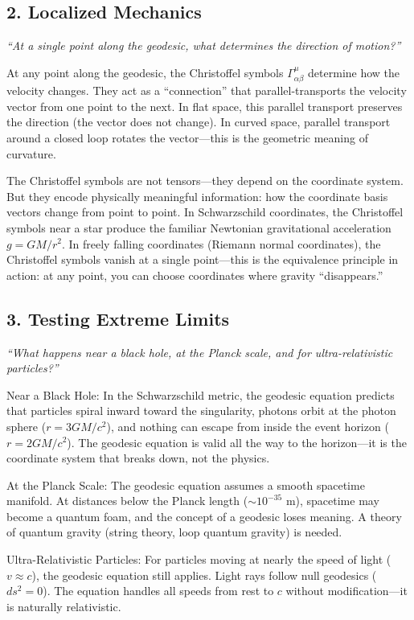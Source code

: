 \documentclass[11pt,openright]{book}
\begin{document}
\subsection*{2. Localized Mechanics}
\textit{``At a single point along the geodesic, what determines the direction of motion?''}

At any point along the geodesic, the Christoffel symbols $\Gamma^\mu_{\alpha\beta}$ determine how the velocity changes. They act as a ``connection'' that parallel-transports the velocity vector from one point to the next. In flat space, this parallel transport preserves the direction (the vector does not change). In curved space, parallel transport around a closed loop rotates the vector---this is the geometric meaning of curvature.

The Christoffel symbols are not tensors---they depend on the coordinate system. But they encode physically meaningful information: how the coordinate basis vectors change from point to point. In Schwarzschild coordinates, the Christoffel symbols near a star produce the familiar Newtonian gravitational acceleration $g = GM/r^2$. In freely falling coordinates (Riemann normal coordinates), the Christoffel symbols vanish at a single point---this is the equivalence principle in action: at any point, you can choose coordinates where gravity ``disappears.''

\subsection*{3. Testing Extreme Limits}
\textit{``What happens near a black hole, at the Planck scale, and for ultra-relativistic particles?''}

Near a Black Hole: In the Schwarzschild metric, the geodesic equation predicts that particles spiral inward toward the singularity, photons orbit at the photon sphere ($r = 3GM/c^2$), and nothing can escape from inside the event horizon ($r = 2GM/c^2$). The geodesic equation is valid all the way to the horizon---it is the coordinate system that breaks down, not the physics.

At the Planck Scale: The geodesic equation assumes a smooth spacetime manifold. At distances below the Planck length ($\sim 10^{-35}$ m), spacetime may become a quantum foam, and the concept of a geodesic loses meaning. A theory of quantum gravity (string theory, loop quantum gravity) is needed.

Ultra-Relativistic Particles: For particles moving at nearly the speed of light ($v \approx c$), the geodesic equation still applies. Light rays follow null geodesics ($ds^2 = 0$). The equation handles all speeds from rest to $c$ without modification---it is naturally relativistic.
\end{document}
